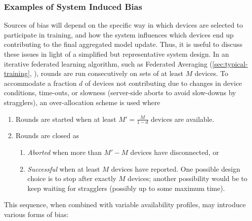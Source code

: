 \documentclass[11pt]{article}
\begin{document}
\subsubsection{Examples of System Induced Bias}
Sources of bias will depend on the specific way in which devices are selected to participate in training, and how the system influences which devices end up contributing to the final aggregated model update. Thus, it is useful to discuss these issues in light of a simplified but representative system design. In an iterative federated learning algorithm, such as Federated Averaging (\cref{sec:typical-training}, \citep{mcmahan17fedavg}), rounds are run consecutively on sets of at least $M$ devices. To accommodate a fraction $d$ of devices not contributing due to changes in device conditions, time-outs, or slowness (server-side aborts to avoid slow-downs by stragglers), an over-allocation scheme is used where
\begin{enumerate}
    \item Rounds are started when at least $M'=\frac{M}{1-d}$ devices are available.
    \item Rounds are closed as
    \begin{enumerate}
        \item \emph{Aborted} when more than $M' - M$ devices have disconnected, or
        \item \emph{Successful} when at least $M$ devices have reported. One possible design choice is to stop after exactly $M$ devices; another possibility would be to keep waiting for stragglers (possibly up to some maximum time).
    \end{enumerate}
\end{enumerate}
This sequence, when combined with variable availability profiles, may introduce various forms of bias:
\end{document}
